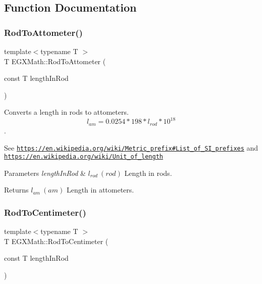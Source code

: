 \subsection{Function Documentation}
\mbox{\label{group___e_g_x_math-_conversions-_length_conversions-_surveyors-_rod-_s_i_ga8ea230e8e68a945a135edff4ba01a449}} 
\subsubsection{\texorpdfstring{Rod\+To\+Attometer()}{RodToAttometer()}}
{\footnotesize\ttfamily template$<$typename T $>$ \\
T E\+G\+X\+Math\+::\+Rod\+To\+Attometer (\begin{DoxyParamCaption}\item[{const T}]{length\+In\+Rod }\end{DoxyParamCaption})}



Converts a length in rods to attometers. \[ l_{am}=0.0254 * 198 * l_{rod} * 10^{18} \]. 

See \href{https://en.wikipedia.org/wiki/Metric_prefix#List_of_SI_prefixes}{\tt https\+://en.\+wikipedia.\+org/wiki/\+Metric\+\_\+prefix\#\+List\+\_\+of\+\_\+\+S\+I\+\_\+prefixes} and \href{https://en.wikipedia.org/wiki/Unit_of_length}{\tt https\+://en.\+wikipedia.\+org/wiki/\+Unit\+\_\+of\+\_\+length} 
\begin{DoxyParams}{Parameters}
{\em length\+In\+Rod} & $ l_{rod}\ (rod)$ Length in rods. \\
\hline
\end{DoxyParams}
\begin{DoxyReturn}{Returns}
$ l_{am}\ (am)$ Length in attometers. 
\end{DoxyReturn}
\mbox{\label{group___e_g_x_math-_conversions-_length_conversions-_surveyors-_rod-_s_i_ga606f24d4f57fa79ea29cd16903899849}} 
\subsubsection{\texorpdfstring{Rod\+To\+Centimeter()}{RodToCentimeter()}}
{\footnotesize\ttfamily template$<$typename T $>$ \\
T E\+G\+X\+Math\+::\+Rod\+To\+Centimeter (\begin{DoxyParamCaption}\item[{const T}]{length\+In\+Rod }\end{DoxyParamCaption})}



